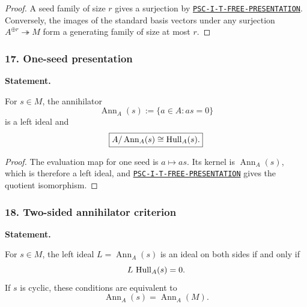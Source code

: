 \begin{proof}
A seed family of size $r$ gives a surjection by \hyperref[rec:PSC-I-T-FREE-PRESENTATION]{\nolinkurl{PSC-I-T-FREE-PRESENTATION}}.  Conversely, the images of the standard basis vectors under any surjection $A^{\oplus r}\twoheadrightarrow M$ form a generating family of size at most $r$.
\end{proof}
\subsubsection*{17. One-seed presentation}
\label{rec:PSC-I-C-ONE-SEED-PRESENTATION}
\textbf{Statement.}\par
For $s\in M$, the annihilator
\[
\operatorname{Ann}_A(s):=\{a\in A:as=0\}
\]
is a left ideal and
\[
\boxed{A/\operatorname{Ann}_A(s)\cong\operatorname{Hull}_A(s).}
\]

\begin{proof}
The evaluation map for one seed is $a\mapsto as$.  Its kernel is $\operatorname{Ann}_A(s)$, which is therefore a left ideal, and \hyperref[rec:PSC-I-T-FREE-PRESENTATION]{\nolinkurl{PSC-I-T-FREE-PRESENTATION}} gives the quotient isomorphism.
\end{proof}
\subsubsection*{18. Two-sided annihilator criterion}
\label{rec:PSC-I-P-ANNIHILATOR-TWO-SIDED}
\textbf{Statement.}\par
For $s\in M$, the left ideal $L=\operatorname{Ann}_A(s)$ is an ideal on both sides if and only if
\[
L\,\operatorname{Hull}_A(s)=0.
\]
If $s$ is cyclic, these conditions are equivalent to
\[
\operatorname{Ann}_A(s)=\operatorname{Ann}_A(M).
\]

